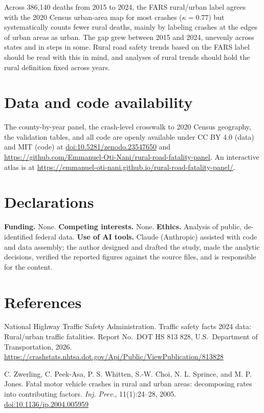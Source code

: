 \documentclass{article}
\begin{document}
Across 386{,}140 deaths from 2015 to 2024, the FARS rural/urban label agrees with the 2020 Census urban-area map for most crashes ($\kappa = 0.77$) but systematically counts fewer rural deaths, mainly by labeling crashes at the edges of urban areas as urban. The gap grew between 2015 and 2024, unevenly across states and in steps in some. Rural road safety trends based on the FARS label should be read with this in mind, and analyses of rural trends should hold the rural definition fixed across years.

\section*{Data and code availability}

The county-by-year panel, the crash-level crosswalk to 2020 Census geography, the validation tables, and all code are openly available under CC BY 4.0 (data) and MIT (code) at \href{https://doi.org/10.5281/zenodo.23547650}{doi:10.5281/zenodo.23547650} and \url{https://github.com/Emmanuel-Oti-Nani/rural-road-fatality-panel}. An interactive atlas is at \url{https://emmanuel-oti-nani.github.io/rural-road-fatality-panel/}.

\section*{Declarations}

\textbf{Funding.} None. \textbf{Competing interests.} None. \textbf{Ethics.} Analysis of public, de-identified federal data. \textbf{Use of AI tools.} Claude (Anthropic) assisted with code and data assembly; the author designed and drafted the study, made the analytic decisions, verified the reported figures against the source files, and is responsible for the content.


\section*{References}
\noindent [1] National Highway Traffic Safety Administration. Traffic safety facts 2024 data: Rural/urban traffic fatalities. Report No.\ DOT HS 813 828, U.S.\ Department of Transportation, 2026. \url{https://crashstats.nhtsa.dot.gov/Api/Public/ViewPublication/813828}

\noindent [2] C. Zwerling, C. Peek-Asa, P. S. Whitten, S.-W. Choi, N. L. Sprince, and M. P. Jones. Fatal motor vehicle crashes in rural and urban areas: decomposing rates into contributing factors. \textit{Inj. Prev.}, 11(1):24--28, 2005. \href{https://doi.org/10.1136/ip.2004.005959}{doi:10.1136/ip.2004.005959}
\end{document}
